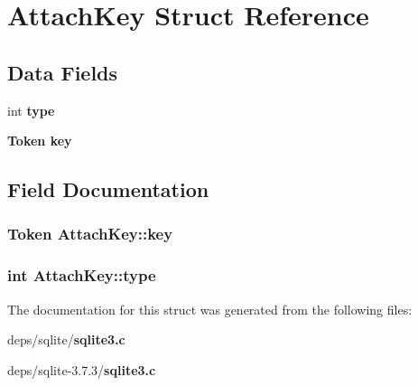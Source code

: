 \section{Attach\-Key Struct Reference}
\label{structAttachKey}
\subsection*{Data Fields}
\begin{CompactItemize}
\item 
int \bf{type}
\item 
\bf{Token} \bf{key}
\end{CompactItemize}


\subsection{Field Documentation}
\subsubsection{\setlength{\rightskip}{0pt plus 5cm}\bf{Token} \bf{Attach\-Key::key}}\label{structAttachKey_cc3bfc3722e03736d33829ef6221216e}


\subsubsection{\setlength{\rightskip}{0pt plus 5cm}int \bf{Attach\-Key::type}}\label{structAttachKey_5a016cf95b434dba65ac46668eca30de}




The documentation for this struct was generated from the following files:\begin{CompactItemize}
\item 
deps/sqlite/\bf{sqlite3.c}\item 
deps/sqlite-3.7.3/\bf{sqlite3.c}\end{CompactItemize}
